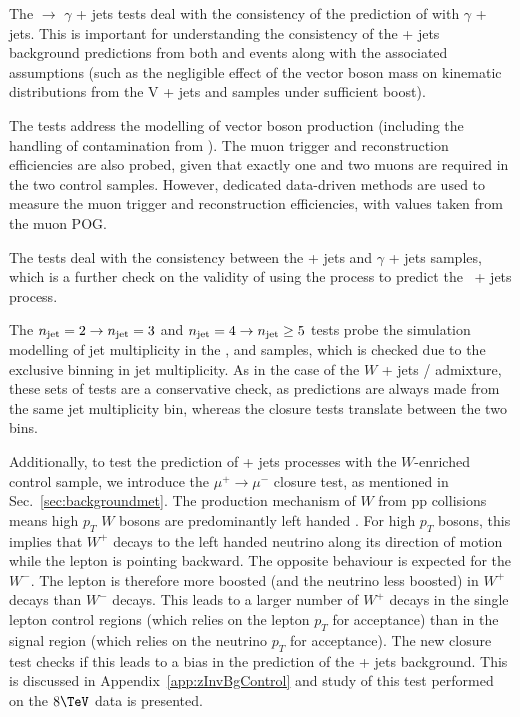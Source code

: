 The \mj $\rightarrow$ $\gamma$ + jets tests deal with
the consistency of the prediction of \wej with $\gamma$ + jets. This is 
important for understanding
the consistency of the \znunu + jets background predictions from both
\wej and \gj events along with the associated assumptions (such
as the negligible effect of the vector boson mass on kinematic
distributions from the V + jets and \gj samples under sufficient
boost). 

The \mj \rightarrow \mmj tests address the modelling of vector boson production
(including the handling of contamination from \ttbar). The muon
trigger and reconstruction efficiencies are also probed, given that
exactly one and two muons are required in the two control
samples. However, dedicated data-driven methods are used to measure
the muon trigger and reconstruction efficiencies, with values taken
from the muon POG.

The \mmj \rightarrow \gj tests deal with the
consistency between the \zee + jets and $\gamma$ + jets
samples, which is a further check on the validity of using the \gj
process to predict the \znunu\, + jets process.

The $n_{\text{jet}}=2\rightarrow n_{\text{jet}}=3$ and $n_{\text{jet}}=4\rightarrow n_{\text{jet}}\geq5$ tests 
probe the simulation modelling of jet
multiplicity in the \mj,
\mmj and \gj samples,
which is checked due to the exclusive binning in jet multiplicity.  As
in the case of the $W$ + jets / \ttbar admixture, these sets of tests
are a conservative check, as predictions are always made from the same
jet multiplicity bin, whereas the closure tests translate between the
two bins.

Additionally, to test the prediction of \znunu + jets processes with
the $W$-enriched \mj control sample, we introduce the
$\mu^{+}\rightarrow\mu^{-}$ closure test, as mentioned in
Sec.~\ref{sec:backgroundmet}. The production mechanism of $W$ from pp collisions means
high $p_T$ $W$ bosons are predominantly left handed \cite{WPol}.  
For high $p_T$ bosons, this implies that $W^+$ decays 
to the left handed neutrino along its direction of motion while 
the lepton is pointing backward. The opposite behaviour is
expected for the $W^-$. The lepton is therefore more boosted (and
the neutrino less boosted) in $W^+$ decays than $W^-$ decays.  This
leads to a larger number of $W^+$ decays in the single lepton control
regions (which relies on the lepton $p_T$ for acceptance) than in the
signal region (which relies on the neutrino $p_T$ for acceptance). The
new closure test checks if this leads to a bias in the prediction of the 
\znunu + jets background. This is discussed in
Appendix~\ref{app:zInvBgControl} and study of this test performed on the
$8\tev$ data is presented.

